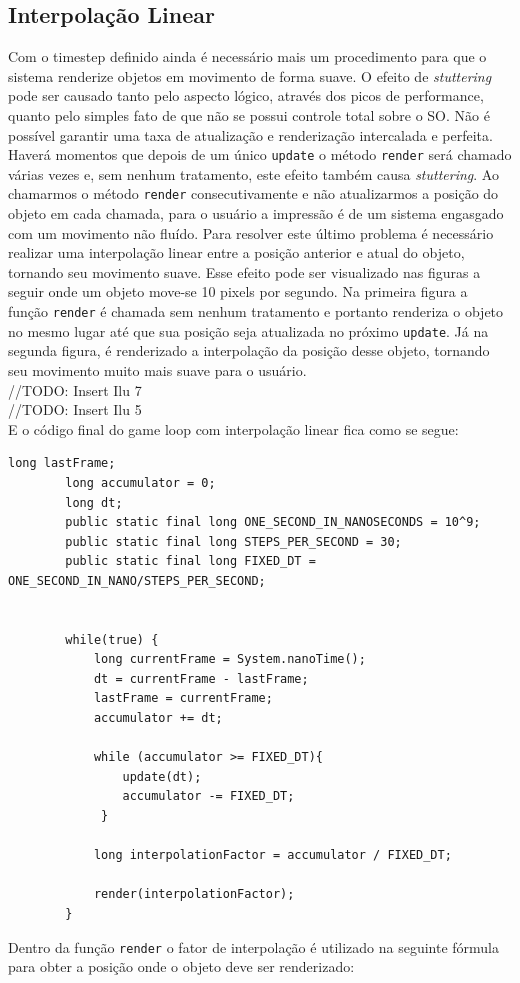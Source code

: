 \documentclass[12pt, 
openright, 
oneside, 
a4paper,    
brazil]{facom-ufu-abntex2}
\begin{document}
\subsection{Interpolação Linear} 
Com o timestep definido ainda é necessário mais um procedimento para que o sistema renderize objetos em movimento de forma suave. O efeito de \textit{stuttering} pode ser causado tanto pelo aspecto lógico, através dos picos de performance, quanto pelo simples fato de que não se possui controle total sobre o SO. Não é possível garantir uma taxa de atualização e renderização intercalada e perfeita. Haverá momentos que depois de um único \texttt{update} o método \texttt{render} será chamado várias vezes e, sem nenhum tratamento, este efeito também causa \textit{stuttering}. Ao chamarmos o método \texttt{render} consecutivamente e não atualizarmos a posição do objeto em cada chamada, para o usuário a impressão é de um sistema engasgado com um movimento não fluído.
Para resolver este último problema é necessário realizar uma interpolação linear entre a posição anterior e atual do objeto, tornando seu movimento suave. Esse efeito pode ser visualizado nas figuras a seguir onde um objeto move-se 10 pixels por segundo. Na primeira figura a função \texttt{render} é chamada sem nenhum tratamento e portanto renderiza o objeto no mesmo lugar até que sua posição seja atualizada no próximo \texttt{update}. Já na segunda figura, é renderizado a interpolação da posição desse objeto, tornando seu movimento muito mais suave para o usuário.
\\//TODO: Insert Ilu 7
\\//TODO: Insert Ilu 5\\
E o código final do game loop com interpolação linear fica como se segue:
\begin{lstlisting}[caption=Game Loop com timestep semi-fixo e interpolação linear]
		long lastFrame;
		long accumulator = 0;
		long dt;
		public static final long ONE_SECOND_IN_NANOSECONDS = 10^9;
		public static final long STEPS_PER_SECOND = 30;
		public static final long FIXED_DT = ONE_SECOND_IN_NANO/STEPS_PER_SECOND;
		
		
		while(true) {
			long currentFrame = System.nanoTime(); 
			dt = currentFrame - lastFrame;
			lastFrame = currentFrame;
			accumulator += dt;
	
			while (accumulator >= FIXED_DT){
    			update(dt);
    			accumulator -= FIXED_DT;
 			 }
 			 
			long interpolationFactor = accumulator / FIXED_DT; 			 
 			 
			render(interpolationFactor);
		}
\end{lstlisting}
Dentro da função \texttt{render} o fator de interpolação é utilizado na seguinte fórmula para obter a posição onde o objeto deve ser renderizado:
\end{document}
